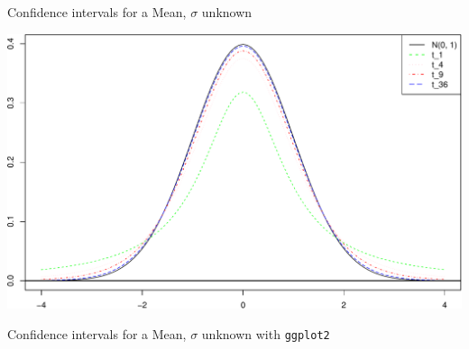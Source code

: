 \documentclass[
  ignorenonframetext,
]{beamer}
\begin{document}
\begin{frame}[fragile]{Confidence intervals for a Mean, \(\sigma\)
unknown}
\begin{center}\includegraphics[width=0.6\linewidth,height=0.4\textheight]{Week10_Lect_files/figure-beamer/unnamed-chunk-56-1} \end{center}
\normalsize
\end{frame}

\begin{frame}[fragile]{Confidence intervals for a Mean, \(\sigma\)
unknown}
\protect\hypertarget{confidence-intervals-for-a-mean-sigma-unknown-5}{}
with \texttt{ggplot2}

\tiny


\end{frame}
\end{document}
